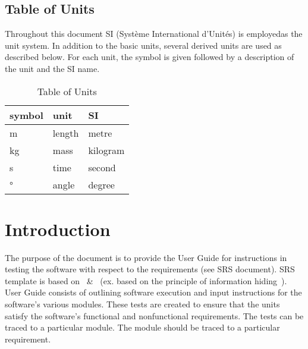 \documentclass[12pt, titlepage]{article}
\begin{document}
\subsection{Table of Units}

Throughout this document SI (Syst\`{e}me International d'Unit\'{e}s) is
employedas the unit system. In addition to the basic units, several derived
units are
used as described below.  For each unit, the symbol is given followed by a
description of the unit and the SI name.\\

\renewcommand{\arraystretch}{1.2}
\begin{table}[h!]
	\centering
\begin{center}
  \noindent \begin{tabular}{l l l} 
    \toprule		
    \textbf{symbol} & \textbf{unit} & \textbf{SI}\\
    \midrule 
    \si{\metre} & length & metre\\
    \si{\kilogram} & mass & kilogram\\
    \si{\second} & time & second\\
    \si{\degree} & angle & degree\\
    \bottomrule
  \end{tabular}
\end{center}
	\caption{Table of Units}
	\label{Table:R_trace}
\end{table}

\newpage

\tableofcontents

\listoftables %

\listoffigures %

\newpage


\section{Introduction}

The purpose of the document is to provide the User Guide
for instructions in testing the \progname{}software with 
respect to the requirements (see SRS document). SRS template is based 
on~\citep{SmithAndLai2005} \&~\citep{SmithEtAl2007}
(ex. based on the principle of information hiding~\citep{Parnas1972a}).
User Guide consists of outlining software execution and 
input instructions for the software's 
various modules. These tests are created to ensure that the units satisfy 
the software's functional and nonfunctional requirements. The tests can be 
traced to a particular module. The module should be traced to a particular 
requirement. 
\end{document}
